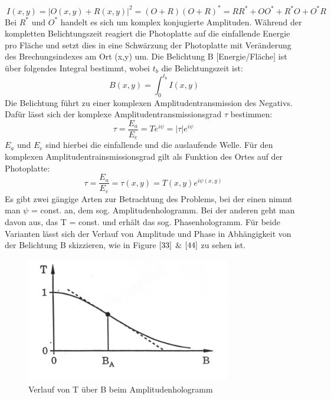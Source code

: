 \documentclass[12pt,a4paper]{article}
\begin{document}
\begin{equation}
\ I(x,y) = |O(x,y) + R(x,y)|^{2} = (O+R)(O+R)^{*} = RR^{*} + OO^{*} + R^{*}O + O^{*}R
\label {1}
\end{equation}
Bei $R^{*}$ und $ O^{*}$ handelt es sich um komplex konjugierte Amplituden. Während der kompletten Belichtungszeit reagiert die Photoplatte auf die einfallende Energie pro Fläche und setzt dies in eine Schwärzung der Photoplatte mit Veränderung des Brechungsindexes am Ort (x,y) um. Die Belichtung B [Energie/Fläche] ist über folgendes Integral bestimmt, wobei $t_{b}$ die Belichtungszeit ist:
\begin{equation}
\ B(x,y) = \int_{0}^{t_{b}}I(x,y) 
\label {1}
\end{equation}
Die Belichtung führt zu einer komplexen Amplitudentransmission des Negativs. Dafür lässt sich der komplexe Amplitudentransmissionsgrad $\tau$ bestimmen:
\begin{equation}
\tau = \frac{E_{a}}{E_e}  = Te^{i\psi} = |\tau|e^{i\psi}
\label {1}
\end{equation}
$E_{a}$ und $E_{e}$ sind hierbei die einfallende und die auslaufende Welle. Für den komplexen Amplitudentrainsmissionsgrad gilt als Funktion des Ortes auf der Photoplatte:
\begin{equation}
\tau = \frac{E_{a}}{E_e} = \tau(x,y) = T(x,y)e^{i\psi(x,y)} 
\label {1}
\end{equation}
Es gibt zwei gängige Arten zur Betrachtung des Problems, bei der einen nimmt man $\psi$ = const. an, dem sog. Amplitudenhologramm. Bei der anderen geht man davon aus, das T = const. und erhält das sog. Phasenhologramm. Für beide Varianten lässt sich der Verlauf von Amplitude und Phase in Abhängigkeit von der Belichtung B skizzieren, wie in Figure $\ref{33}$ $\&$ $\ref{44}$ zu sehen ist.
\begin{figure}[h]
	\includegraphics[scale = 0.5]{Amptrans.png}
	\centering
	\caption{Verlauf von T über B beim Amplitudenhologramm}
	\label{33}
\end{figure}
\end{document}
